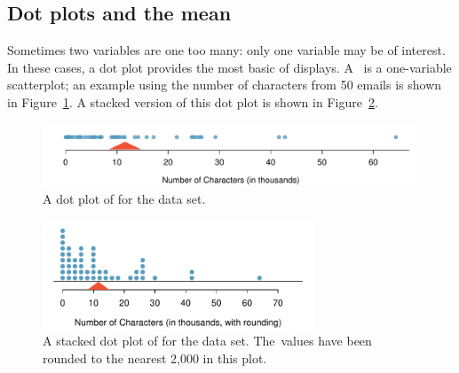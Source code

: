 \subsection{Dot plots and the mean}
\label{dotPlot}

Sometimes two variables are one too many: only one variable may be of interest. In these cases, a dot plot provides the most basic of displays. A~ is a one-variable scatterplot; an example using the number of characters from 50 emails is shown in Figure~\ref{emailCharactersDotPlot}. A stacked version of this dot plot is shown in Figure~\ref{emailCharactersDotPlotStacked}.

\begin{figure}[h]
   \centering
   \includegraphics[width=\textwidth]{ch_intro_to_data/figures/emailCharactersDotPlot/emailCharactersDotPlot}
   \caption{A dot plot of  for the  data set.}
   \label{emailCharactersDotPlot}
\end{figure}

\begin{figure}[h]
   \centering
   \includegraphics[width=0.72\textwidth]{ch_intro_to_data/figures/emailCharactersDotPlot/emailCharactersDotPlotStacked}
   \caption{A stacked dot plot of  for the  data set. The~values have been rounded to the nearest 2,000 in this plot.}
   \label{emailCharactersDotPlotStacked}
\end{figure}

